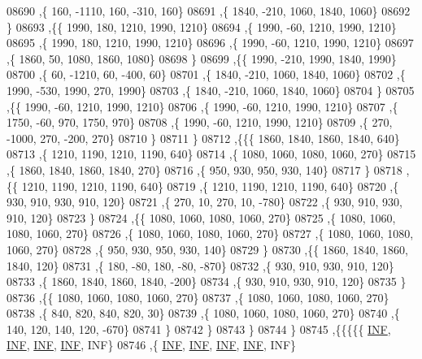 \begin{DoxyCode}
08690     ,\{   160, -1110,   160,  -310,   160\}
08691     ,\{  1840,  -210,  1060,  1840,  1060\}
08692     \}
08693    ,\{\{  1990,   180,  1210,  1990,  1210\}
08694     ,\{  1990,   -60,  1210,  1990,  1210\}
08695     ,\{  1990,   180,  1210,  1990,  1210\}
08696     ,\{  1990,   -60,  1210,  1990,  1210\}
08697     ,\{  1860,    50,  1080,  1860,  1080\}
08698     \}
08699    ,\{\{  1990,  -210,  1990,  1840,  1990\}
08700     ,\{    60, -1210,    60,  -400,    60\}
08701     ,\{  1840,  -210,  1060,  1840,  1060\}
08702     ,\{  1990,  -530,  1990,   270,  1990\}
08703     ,\{  1840,  -210,  1060,  1840,  1060\}
08704     \}
08705    ,\{\{  1990,   -60,  1210,  1990,  1210\}
08706     ,\{  1990,   -60,  1210,  1990,  1210\}
08707     ,\{  1750,   -60,   970,  1750,   970\}
08708     ,\{  1990,   -60,  1210,  1990,  1210\}
08709     ,\{   270, -1000,   270,  -200,   270\}
08710     \}
08711    \}
08712   ,\{\{\{  1860,  1840,  1860,  1840,   640\}
08713     ,\{  1210,  1190,  1210,  1190,   640\}
08714     ,\{  1080,  1060,  1080,  1060,   270\}
08715     ,\{  1860,  1840,  1860,  1840,   270\}
08716     ,\{   950,   930,   950,   930,   140\}
08717     \}
08718    ,\{\{  1210,  1190,  1210,  1190,   640\}
08719     ,\{  1210,  1190,  1210,  1190,   640\}
08720     ,\{   930,   910,   930,   910,   120\}
08721     ,\{   270,    10,   270,    10,  -780\}
08722     ,\{   930,   910,   930,   910,   120\}
08723     \}
08724    ,\{\{  1080,  1060,  1080,  1060,   270\}
08725     ,\{  1080,  1060,  1080,  1060,   270\}
08726     ,\{  1080,  1060,  1080,  1060,   270\}
08727     ,\{  1080,  1060,  1080,  1060,   270\}
08728     ,\{   950,   930,   950,   930,   140\}
08729     \}
08730    ,\{\{  1860,  1840,  1860,  1840,   120\}
08731     ,\{   180,   -80,   180,   -80,  -870\}
08732     ,\{   930,   910,   930,   910,   120\}
08733     ,\{  1860,  1840,  1860,  1840,  -200\}
08734     ,\{   930,   910,   930,   910,   120\}
08735     \}
08736    ,\{\{  1080,  1060,  1080,  1060,   270\}
08737     ,\{  1080,  1060,  1080,  1060,   270\}
08738     ,\{   840,   820,   840,   820,    30\}
08739     ,\{  1080,  1060,  1080,  1060,   270\}
08740     ,\{   140,   120,   140,   120,  -670\}
08741     \}
08742    \}
08743   \}
08744  \}
08745 ,\{\{\{\{\{   \hyperlink{energy__const_8h_a12c2040f25d8e3a7b9e1c2024c618cb6}{INF},   \hyperlink{energy__const_8h_a12c2040f25d8e3a7b9e1c2024c618cb6}{INF},   \hyperlink{energy__const_8h_a12c2040f25d8e3a7b9e1c2024c618cb6}{INF},   \hyperlink{energy__const_8h_a12c2040f25d8e3a7b9e1c2024c618cb6}{INF},   INF\}
08746     ,\{   \hyperlink{energy__const_8h_a12c2040f25d8e3a7b9e1c2024c618cb6}{INF},   \hyperlink{energy__const_8h_a12c2040f25d8e3a7b9e1c2024c618cb6}{INF},   \hyperlink{energy__const_8h_a12c2040f25d8e3a7b9e1c2024c618cb6}{INF},   \hyperlink{energy__const_8h_a12c2040f25d8e3a7b9e1c2024c618cb6}{INF},   INF\}

\end{DoxyCode}
